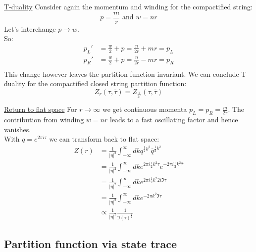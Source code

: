 \documentclass[11pt,aspectratio=169]{beamer}
\begin{document}
\begin{frame}{\underline{T-duality}}
	Consider again the momentum and winding for the compactified string:
	\begin{equation}
		p = \frac{m}{r} \textrm{ and } w = nr
	\end{equation}
	Let's interchange $p \rightarrow w$. 
	\\
	So:
	\begin{align*}
		p_L' &= \frac{w}{2} + p = \frac{n}{2r} + mr = p_L\\
		p_R' &= \frac{w}{2} + p = \frac{n}{2r} - mr = p_R \\
	\end{align*}
	This change however leaves the partition function invariant. We can conclude T-duality for the compactified closed string partition function:
	\begin{equation}
		Z_r (\tau, \bar{\tau}) = Z_{\frac{1}{2r}} (\tau, \bar{\tau})
	\end{equation}
\end{frame}

\begin{frame}{\underline{Return to flat space}}
	For $r \rightarrow \infty$ we get continuous momenta $p_L = p_R = \frac{m}{2r}$. 
	The contribution from winding $w = nr$ leads to a fast oscillating factor and hence vanishes.
	\\
	With $q = e^{2\pi i \tau}$ we can transform back to flat space:
	\begin{align*}
		Z(r) &= \frac{1}{|\eta|^2} \int_{-\infty}^{\infty}dk q^{\frac{1}{2}k^2}\bar{q}^{\frac{1}{2}k^2} \\
		&= \frac{1}{|\eta|^2} \int_{-\infty}^{\infty}dk e^{2\pi i \frac{1}{2}k^2 \tau}e^{-2\pi i \frac{1}{2}k^2 \bar{\tau}} \\
		&= \frac{1}{|\eta|^2} \int_{-\infty}^{\infty}dk e^{2\pi i \frac{1}{2}k^2 2 i \Im{\tau}} \\
		&= \frac{1}{|\eta|^2} \int_{-\infty}^{\infty}dk e^{-2\pi k^2 \Im{\tau}} \\
		&\propto \frac{1}{|\eta|^2} \frac{1}{\Im(\tau)^{\frac{1}{2}}}
	\end{align*}
	
\end{frame}









\subsection{Partition function via state trace}
\end{document}
